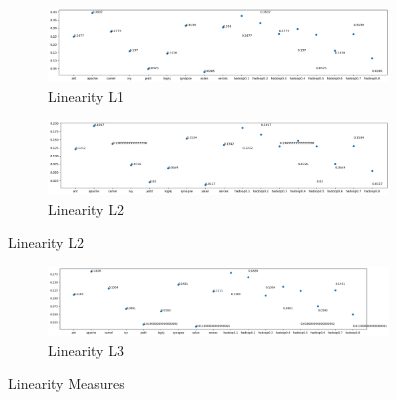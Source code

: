 \begin{figure}[h!]
    \centering
    \begin{subfigure}{0.496\textwidth}
        \includegraphics[width=0.99\textwidth]{figures/linearity-L1.png}
        \caption{Linearity L1}
        \label{fig:linearity-l1}
    \end{subfigure}
    \begin{subfigure}{0.496\textwidth}
        \includegraphics[width=0.99\textwidth]{figures/linearity-L2.png}
        \caption{Linearity L2}
        \label{fig:linearity-l2}
    \end{subfigure}
\end{figure}
\begin{figure}[h!]\ContinuedFloat
    \centering
    \begin{subfigure}{0.496\textwidth}
        \includegraphics[width=0.99\textwidth]{figures/linearity-L3.png}
        \caption{Linearity L3}
        \label{fig:linearity-l3}
    \end{subfigure}
    \caption{Linearity Measures}
    \label{fig:linearity}
\end{figure}

